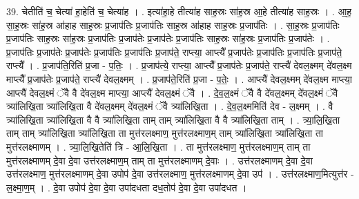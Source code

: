 \documentclass[17pt]{extarticle}
\begin{document}
39. चेतीति॑ च॒ चेत्या॑ हा॒हेति॑ च॒ चेत्या॑ह । . इत्या॑हा॒हे तीत्या॑ह साह॒स्रः सा॑ह॒स्र आ॒हे तीत्या॑ह साह॒स्रः । . आ॒ह॒ सा॒ह॒स्रः सा॑ह॒स्र आ॑हाह साह॒स्रः प्र॒जाप॑तिः प्र॒जाप॑तिः साह॒स्र आ॑हाह साह॒स्रः प्र॒जाप॑तिः । . सा॒ह॒स्रः प्र॒जाप॑तिः प्र॒जाप॑तिः साह॒स्रः सा॑ह॒स्रः प्र॒जाप॑तिः प्र॒जाप॑तेः प्र॒जाप॑तेः प्र॒जाप॑तिः साह॒स्रः सा॑ह॒स्रः प्र॒जाप॑तिः प्र॒जाप॑तेः । . प्र॒जाप॑तिः प्र॒जाप॑तेः प्र॒जाप॑तेः प्र॒जाप॑तिः प्र॒जाप॑तिः प्र॒जाप॑ते॒ राप्त्या॒ आप्त्यै᳚ प्र॒जाप॑तेः प्र॒जाप॑तिः प्र॒जाप॑तिः प्र॒जाप॑ते॒ राप्त्यै᳚ । . प्र॒जाप॑ति॒रिति॑ प्र॒जा - प॒तिः॒ । . प्र॒जाप॑त्ये॒ राप्त्या॒ आप्त्यै᳚ प्र॒जाप॑तेः प्र॒जाप॑ते॒ राप्त्यै॑ देवल॒क्ष्मम् दे॑वल॒क्ष्म माप्त्यै᳚ प्र॒जाप॑तेः प्र॒जाप॑ते॒ राप्त्यै॑ देवल॒क्ष्मम् । . प्र॒जाप॑ते॒रिति॑ प्र॒जा - प॒तेः॒ । . आप्त्यै॑ देवल॒क्ष्मम् दे॑वल॒क्ष्म माप्त्या॒ आप्त्यै॑ देवल॒क्ष्मं ॅवै वै दे॑वल॒क्ष्म माप्त्या॒ आप्त्यै॑ देवल॒क्ष्मं ॅवै । . दे॒व॒ल॒क्ष्मं ॅवै वै दे॑वल॒क्ष्मम् दे॑वल॒क्ष्मं ॅवै त्र्या॑लिखि॒ता त्र्या॑लिखि॒ता वै दे॑वल॒क्ष्मम् दे॑वल॒क्ष्मं ॅवै त्र्या॑लिखि॒ता । . दे॒व॒ल॒क्ष्ममिति॑ देव - ल॒क्ष्मम् । . वै त्र्या॑लिखि॒ता त्र्या॑लिखि॒ता वै वै त्र्या॑लिखि॒ता ताम् ताम् त्र्या॑लिखि॒ता वै वै त्र्या॑लिखि॒ता ताम् । . त्र्या॒लि॒खि॒ता ताम् ताम् त्र्या॑लिखि॒ता त्र्या॑लिखि॒ता ता मुत्त॑रलक्ष्माण॒ मुत्त॑रलक्ष्माण॒म् ताम् त्र्या॑लिखि॒ता त्र्या॑लिखि॒ता ता मुत्त॑रलक्ष्माणम् । . त्र्या॒लि॒खि॒तेति॑ त्रि - आ॒लि॒खि॒ता । . ता मुत्त॑रलक्ष्माण॒ मुत्त॑रलक्ष्माण॒म् ताम् ता मुत्त॑रलक्ष्माणम् दे॒वा दे॒वा उत्त॑रलक्ष्माण॒म् ताम् ता मुत्त॑रलक्ष्माणम् दे॒वाः । . उत्त॑रलक्ष्माणम् दे॒वा दे॒वा उत्त॑रलक्ष्माण॒ मुत्त॑रलक्ष्माणम् दे॒वा उपोप॑ दे॒वा उत्त॑रलक्ष्माण॒ मुत्त॑रलक्ष्माणम् दे॒वा उप॑ । . उत्त॑रलक्ष्माण॒मित्युत्त॑र - ल॒क्ष्मा॒ण॒म् । . दे॒वा उपोप॑ दे॒वा दे॒वा उपा॑दधता दध॒तोप॑ दे॒वा दे॒वा उपा॑दधत । \newline
\end{document}
